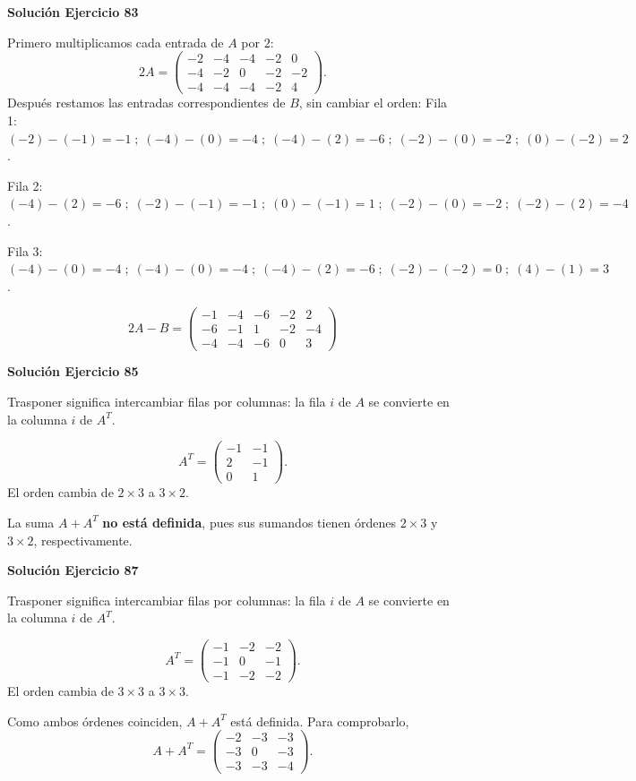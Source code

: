 \documentclass[12pt]{article}
\theoremstyle{remark}
\begin{document}
\par\bigskip\noindent\textbf{Solución Ejercicio 83}\par\nobreak
Primero multiplicamos cada entrada de $A$ por $2$:
\[
2A=\begin{pmatrix}-2&-4&-4&-2&0\\-4&-2&0&-2&-2\\-4&-4&-4&-2&4\end{pmatrix}.
\]
Después restamos las entradas correspondientes de $B$, sin cambiar el orden:
Fila 1: $(-2)-(-1)=-1\; ;\; (-4)-(0)=-4\; ;\; (-4)-(2)=-6\; ;\; (-2)-(0)=-2\; ;\; (0)-(-2)=2$.

Fila 2: $(-4)-(2)=-6\; ;\; (-2)-(-1)=-1\; ;\; (0)-(-1)=1\; ;\; (-2)-(0)=-2\; ;\; (-2)-(2)=-4$.

Fila 3: $(-4)-(0)=-4\; ;\; (-4)-(0)=-4\; ;\; (-4)-(2)=-6\; ;\; (-2)-(-2)=0\; ;\; (4)-(1)=3$.

\[
\boxed{2A-B=\begin{pmatrix}-1&-4&-6&-2&2\\-6&-1&1&-2&-4\\-4&-4&-6&0&3\end{pmatrix}}
\]

\par\bigskip\noindent\textbf{Solución Ejercicio 85}\par\nobreak
Trasponer significa intercambiar filas por columnas: la fila $i$ de $A$ se convierte en la columna $i$ de $A^T$.

\[
A^T=\begin{pmatrix}-1&-1\\2&-1\\0&1\end{pmatrix}.
\]
El orden cambia de $2\times3$ a $3\times2$.

La suma $A+A^T$ \textbf{no está definida}, pues sus sumandos tienen órdenes $2\times3$ y $3\times2$, respectivamente.


\par\bigskip\noindent\textbf{Solución Ejercicio 87}\par\nobreak
Trasponer significa intercambiar filas por columnas: la fila $i$ de $A$ se convierte en la columna $i$ de $A^T$.

\[
A^T=\begin{pmatrix}-1&-2&-2\\-1&0&-1\\-1&-2&-2\end{pmatrix}.
\]
El orden cambia de $3\times3$ a $3\times3$.

Como ambos órdenes coinciden, $A+A^T$ está definida. Para comprobarlo,
\[
A+A^T=\begin{pmatrix}-2&-3&-3\\-3&0&-3\\-3&-3&-4\end{pmatrix}.
\]
\end{document}
